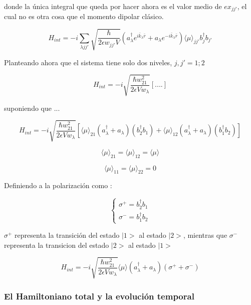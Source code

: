 donde la única integral que queda por hacer ahora es el valor medio de $ex_{jj'}$, el cual no es otra cosa que el momento dipolar clásico.


\begin{equation}
	H_{int}=-i\sum_{\lambda j j'} \sqrt{\frac{\hbar}{2\epsilon w_{jj'}V}}  (a^{\dagger}_{\lambda}e^{i\bar{k}_{\lambda}\bar{r}}+a_{\lambda}e^{-i\bar{k}_{\lambda}\bar{r}})    \langle \mu \rangle_{jj'} b^{\dagger}_jb_{j'}
\end{equation}

Planteando ahora que el sistema tiene solo dos niveles, $j,j'=1;2$

\begin{equation}
	H_{int}=-i\sqrt{ \frac{\hbar w_{21}^2}{2\epsilon V w_{\lambda} } } [....]
\end{equation}

suponiendo que ...

\begin{equation}
	H_{int}=-i\sqrt{ \frac{\hbar w_{21}^2}{2\epsilon V w_{\lambda} } }  [ \langle \mu \rangle_{21}(a^{\dagger}_{\lambda}+a_{\lambda})(b^{\dagger}_2b_{1}) + \langle \mu \rangle_{12} (a^{\dagger}_{\lambda}+a_{\lambda})(b^{\dagger}_1b_{2})  ]
\end{equation}

\[  \langle \mu \rangle_{21}=\langle \mu \rangle_{12}=\langle \mu \rangle   \]

\[\langle \mu \rangle_{11}=\langle \mu \rangle_{22}=0\]

Definiendo a la polarización como :

\begin{equation}
	\begin{cases}
		\sigma^+=b^{\dagger}_2b_{1}\\
		\sigma^-=b^{\dagger}_1b_{2}
	\end{cases}
\end{equation}

$\sigma^+$ representa la transición del estado $|1>$ al estado $|2>$, mientras que $\sigma^-$ representa la transicion del estado $|2>$ al estado $|1>$

\begin{equation}
H_{int}=-i\sqrt{ \frac{\hbar w_{21}^2}{2\epsilon V w_{\lambda} } }   \langle \mu \rangle (a^{\dagger}_{\lambda}+a_{\lambda})(\sigma^+ + \sigma^-) 
\label{eq: h int final}
\end{equation}

\subsubsection{El Hamiltoniano total y la evolución temporal}

